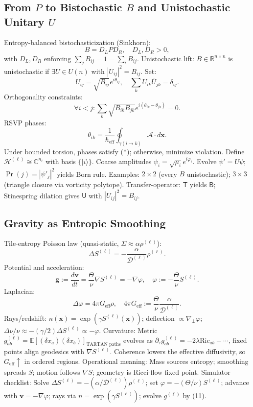 \documentclass[11pt]{article}
\theoremstyle{plain}
\theoremstyle{definition}
\begin{document}
\subsection{From $P$ to Bistochastic $B$ and Unistochastic Unitary $U$}
Entropy-balanced bistochasticization (Sinkhorn):
\[
B = D_L P D_R, \quad D_L, D_R > 0,
\]
with $D_L, D_R$ enforcing $\sum_j B_{ij} = 1 = \sum_i B_{ij}$.
Unistochastic lift: $B \in \mathbb{R}^{n \times n}$ is unistochastic if $\exists U \in U(n)$ with $|U_{ij}|^2 = B_{ij}$. Set:
\[
U_{ij} = \sqrt{B_{ij}} e^{i \theta_{ij}}, \quad \sum_k U_{ik} \overline{U}_{jk} = \delta_{ij}.
\]
Orthogonality constraints:
\[
\forall i < j: \sum_k \sqrt{B_{ik} B_{jk}} e^{i (\theta_{ik} - \theta_{jk})} = 0. \tag{*}
\]
RSVP phases:
\[
\theta_{ik} = \frac{1}{\hbar_{\mathrm{eff}}} \oint_{\gamma(i \to k)} \mathcal{A} \cdot d\bm{x}.
\]
Under bounded torsion, phases satisfy (*); otherwise, minimize violation.
Define $\mathcal{H}^{(\ell)} \cong \mathbb{C}^{n_\ell}$ with basis $\{|i\rangle\}$. Coarse amplitudes $\psi_i = \sqrt{\mu_i} e^{i \varphi_i}$. Evolve $\psi' = U \psi$; $\Pr(j) = |\psi'_j|^2$ yields Born rule.
Examples: $2 \times 2$ (every $B$ unistochastic); $3 \times 3$ (triangle closure via vorticity polytope).
Transfer-operator: $\mathsf{T}$ yields $\mathsf{B}$; Stinespring dilation gives $\mathsf{U}$ with $|U_{ij}|^2 = B_{ij}$.
\subsection{Gravity as Entropic Smoothing}
Tile-entropy Poisson law (quasi-static, $\Sigma \approx \alpha \rho^{(\ell)}$):
\[
\Delta S^{(\ell)} = -\frac{\alpha}{\mathcal{D}^{(\ell)}} \rho^{(\ell)}.
\]
Potential and acceleration:
\[
\bm{g} := \frac{d \bm{v}}{dt} = \frac{\Theta}{\nu} \nabla S^{(\ell)} = -\nabla \varphi, \quad \varphi := -\frac{\Theta}{\nu} S^{(\ell)}.
\]
Laplacian:
\[
\Delta \varphi = 4\pi G_{\mathrm{eff}} \rho, \quad 4\pi G_{\mathrm{eff}} := \frac{\Theta}{\nu} \frac{\alpha}{\mathcal{D}^{(\ell)}}.
\]
Rays/redshift: $n(\bm{x}) = \exp(\gamma S^{(\ell)}(\bm{x}))$; deflection $\propto \nabla_\perp \varphi$; $\Delta \nu / \nu \approx -(\gamma / 2) \Delta S^{(\ell)} \propto - \varphi$.
Curvature: Metric $g_{ab}^{(\ell)} = \mathbb{E}[(\delta x_a)(\delta x_b)]_{\text{TARTAN paths}}$ evolves as $\partial_\tau g_{ab}^{(\ell)} = -2\lambda \mathrm{Ric}_{ab} + \cdots$, fixed points align geodesics with $\nabla S^{(\ell)}$.
Coherence lowers the effective diffusivity, so $G_{\mathrm{eff}}\!\uparrow$ in ordered regions.
Operational meaning: Mass sources entropy; smoothing spreads $S$; motion follows $\nabla S$; geometry is Ricci-flow fixed point.
Simulator checklist: Solve $\Delta S^{(\ell)} = -(\alpha / \mathcal{D}^{(\ell)}) \rho^{(\ell)}$; set $\varphi = -(\Theta / \nu) S^{(\ell)}$; advance with $\dot{\bm{v}} = -\nabla \varphi$; rays via $n = \exp(\gamma S^{(\ell)})$; evolve $g^{(\ell)}$ by (11).
\end{document}
